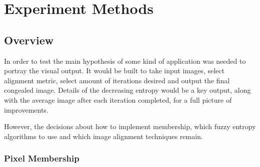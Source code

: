 \chapter{Experiment Methods}





\section{Overview}

In order to test the main hypothesis of  some kind of application was needed to portray the visual output. It would be built to take input images, select alignment metric, select amount of iterations desired and output the final congealed image. Details of the decreasing entropy would be a key output, along with the average image after each iteration completed, for a full picture of improvements.

However, the decisions about how to implement membership, which fuzzy entropy algorithms to use and which image alignment techniques remain.

\subsection{Pixel Membership}
\label{sssec:member}

